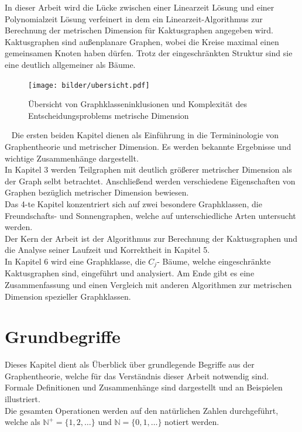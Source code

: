 In dieser Arbeit wird die Lücke zwischen einer Linearzeit Lösung und einer Polynomialzeit Lösung verfeinert in dem ein Linearzeit-Algorithmus zur Berechnung der metrischen Dimension für Kaktusgraphen angegeben wird. Kaktusgraphen sind außenplanare Graphen, wobei die Kreise maximal einen gemeinsamen Knoten haben dürfen. Trotz der eingeschränkten Struktur sind sie eine deutlich allgemeiner als Bäume.
\vspace{-3mm}
\newline
\begin{figure}[h]
\centering
\texttt{[image: bilder/ubersicht.pdf]}
\caption{Übersicht von Graphklasseninklusionen und Komplexität des Entscheidungsproblems metrische Dimension}
\end{figure}
~\linebreak
Die ersten beiden Kapitel dienen als Einführung in die Termininologie von Graphentheorie und metrischer Dimension. Es werden bekannte Ergebnisse und wichtige Zusammenhänge dargestellt.\\In Kapitel 3 werden Teilgraphen mit deutlich größerer metrischer Dimension als der Graph selbt betrachtet. Anschließend werden verschiedene Eigenschaften von Graphen bezüglich metrischer Dimension bewiesen.\\ 
Das 4-te Kapitel konzentriert sich auf zwei besondere Graphklassen, die Freundschafts- und Sonnengraphen, welche auf unterschiedliche Arten untersucht werden.\\Der Kern der Arbeit ist der Algorithmus zur Berechnung der Kaktusgraphen und die Analyse seiner Laufzeit und Korrektheit in Kapitel 5.\\In Kapitel 6 wird eine Graphklasse, die $C_j$- Bäume, welche eingeschränkte Kaktusgraphen sind, eingeführt und analysiert. Am Ende gibt es eine Zusammenfassung und einen Vergleich mit anderen Algorithmen zur metrischen Dimension spezieller Graphklassen.
\chapter{Grundbegriffe}
\vspace{-4mm}
Dieses Kapitel dient als Überblick über grundlegende Begriffe aus der Graphentheorie, welche für das Verständnis dieser Arbeit notwendig sind. Formale Definitionen und Zusammenhänge sind dargestellt und an Beispielen illustriert.%
\\
Die gesamten Operationen werden auf den natürlichen Zahlen durchgeführt, welche als $\mathbb{N}^+=\{1,2,\ldots\}$ und $\mathbb{N}=\{0,1,\ldots\}$ notiert werden.
\vspace{-2mm}
